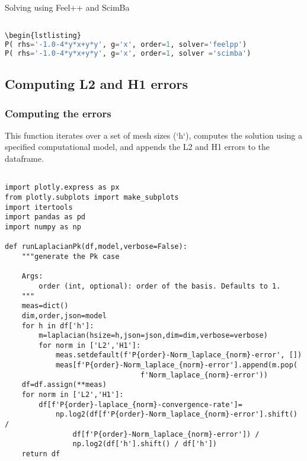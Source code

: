 \documentclass[12pt]{article}
\begin{document}
\newpage


Solving using Feel++ and ScimBa

\begin{lstlisting}[language=Python,caption={},frame=single, backgroundcolor=\color{gray!10}, basicstyle=\footnotesize,rulecolor=\color{blue}, framexleftmargin=3pt, commentstyle=\color{mygreen}, keywordstyle=\color{blue}]

\begin{lstlisting}
P( rhs='-1.0-4*y*x+y*y', g='x', order=1, solver='feelpp')
P( rhs='-1.0-4*y*x+y*y', g='x', order=1, solver ='scimba')
\end{lstlisting}



\subsection{Computing L2 and H1 errors}
\subsubsection{Computing the errors}

This function iterates over a set of mesh sizes (`h`), computes the solution using a specified computational model, and appends the L2 and H1 errors to the dataframe.

\begin{lstlisting}[language=Python3,caption={},frame=single, backgroundcolor=\color{gray!10}, basicstyle=\footnotesize,rulecolor=\color{blue}, framexleftmargin=3pt, commentstyle=\color{mygreen}, keywordstyle=\color{blue}]

import plotly.express as px
from plotly.subplots import make_subplots
import itertools
import pandas as pd
import numpy as np

def runLaplacianPk(df,model,verbose=False):
    """generate the Pk case

    Args:
        order (int, optional): order of the basis. Defaults to 1.
    """
    meas=dict()
    dim,order,json=model
    for h in df['h']:
        m=laplacian(hsize=h,json=json,dim=dim,verbose=verbose)
        for norm in ['L2','H1']:
            meas.setdefault(f'P{order}-Norm_laplace_{norm}-error', [])
            meas[f'P{order}-Norm_laplace_{norm}-error'].append(m.pop(
                                f'Norm_laplace_{norm}-error'))
    df=df.assign(**meas)
    for norm in ['L2','H1']:
        df[f'P{order}-laplace_{norm}-convergence-rate']=
            np.log2(df[f'P{order}-Norm_laplace_{norm}-error'].shift() / 
                df[f'P{order}-Norm_laplace_{norm}-error']) / 
                np.log2(df['h'].shift() / df['h'])
    return df


\end{lstlisting}
\newpage
\end{document}
